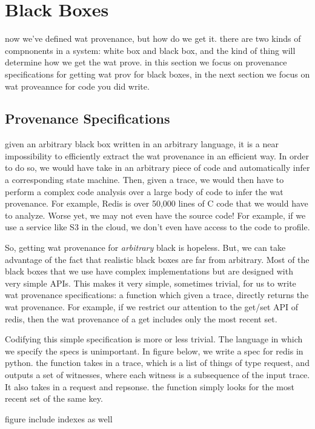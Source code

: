 \section{Black Boxes}
now we've defined wat provenance, but how do we get it. there are two kinds of compnonents in a system: white box and black box, and the kind of thing will determine how we get the wat prove. in this section we focus on provenance specifications for getting wat prov for black boxes, in the next section we focus on wat proveannce for code you did write.


\subsection{Provenance Specifications}
given an arbitrary black box written in an arbitrary language, it is a near impossibility to efficiently extract the wat provenance in an efficient way. In order to do so, we would have take in an arbitrary piece of code and automatically infer a corresponding state machine. Then, given a trace, we would then have to perform a complex code analysis over a large body of code to infer the wat provenance. For example, Redis is over 50,000 lines of C code that we would have to analyze. Worse yet, we may not even have the source code! For example, if we use a service like S3 in the cloud, we don't even have access to the code to profile.

So, getting wat provenance for \emph{arbitrary} black is hopeless. But, we can take advantage of the fact that realistic black boxes are far from arbitrary. Most of the black boxes that we use have complex implementations but are designed with very simple APIs. This makes it very simple, sometimes trivial, for us to write wat provenance specifications: a function which given a trace, directly returns the wat provenance. For example, if we restrict our attention to the get/set API of redis, then the wat provenance of a get includes only the most recent set.

Codifying this simple specification is more or less trivial. The language in which we specify the specs is unimportant. In figure below, we write a spec for redis in python. the function takes in a trace, which is a list of things of type request, and outputs a set of witnesses, where each witness is a subsequence of the input trace. It also takes in a request and repsonse. the function simply looks for the most recent set of the same key.

figure include indexes as well

